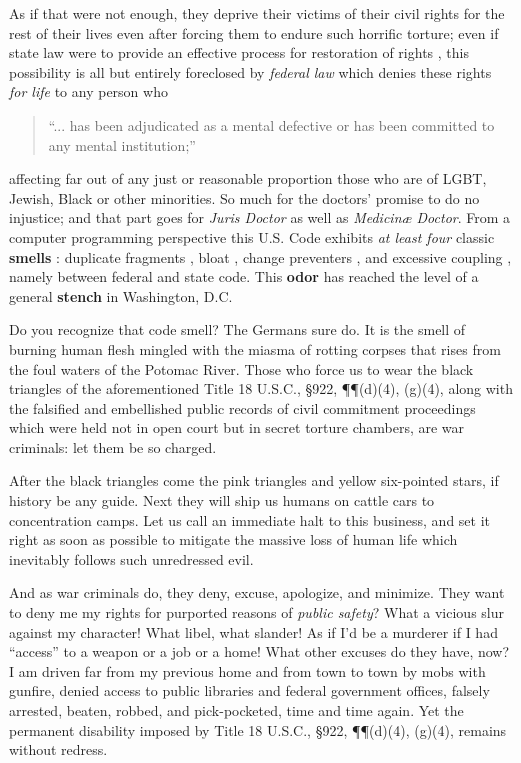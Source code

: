 \documentclass[letterpaper]{article}
\begin{document}
As if that were not enough, they deprive their victims of their civil rights \cite{rcw-9.41.040} for the rest of their lives even after forcing them to endure such horrific torture; even if state law were to provide an effective process for restoration of rights \cite{wac-388-865-0585}, this possibility is all but entirely foreclosed by \textit{federal law} which denies these rights \textit{for life} to any person who
\begin{quote}
``...  \cite[\P\P(d)(4),~(g)(4)]{18usc922} has been adjudicated as a mental defective or has been committed to any mental institution;''
\end{quote}
affecting far out of any just or reasonable proportion those who are of LGBT, Jewish, Black or other minorities.  So much for the doctors' promise to do no injustice; and that part goes for \textit{Juris Doctor} as well as \textit{Medicin{\ae} Doctor}.  From a computer programming perspective this U.S. Code exhibits \textit{at least four} classic \textbf{smells} \cite{fowler2006codesmell}: duplicate fragments \cite{sourcemakingdup}, bloat \cite{sourcemakingbloat}, change preventers \cite{sourcemakingchangepreventers}, and excessive coupling \cite{sourcemakingcouplers}, namely between federal and state code.  This \textbf{odor} has reached the level of a general \textbf{stench} in Washington, D.C.

Do you recognize that code smell?  The Germans sure do.  It is the smell of burning human flesh mingled with the miasma of rotting corpses that rises from the foul waters of the Potomac River.  Those who force us to wear the black triangles of the aforementioned Title 18 U.S.C., \S922, \P\P(d)(4), (g)(4), along with the falsified and embellished public records of civil commitment proceedings which were held not in open court but in secret torture chambers, are war criminals: let them be so charged.

After the black triangles come the pink triangles and yellow six-pointed stars, if history be any guide.  Next they will ship us humans on cattle cars to concentration camps.  Let us call an immediate halt to this business, and set it right as soon as possible to mitigate the massive loss of human life which inevitably follows such unredressed evil.

And as war criminals do, they deny, excuse, apologize, and minimize.  They want to deny me my rights for purported reasons of \textit{public safety}?  What a vicious slur against my character!  What libel, what slander!  As if I'd be a murderer if I had ``access'' to a weapon or a job or a home!  What other excuses do they have, now?  I am driven far from my previous home and from town to town by mobs with gunfire, denied access to public libraries and federal government offices, falsely arrested, beaten, robbed, and pick-pocketed, time and time again.  Yet the permanent disability imposed by Title 18 U.S.C., \S922, \P\P(d)(4), (g)(4), remains without redress.
\end{document}
